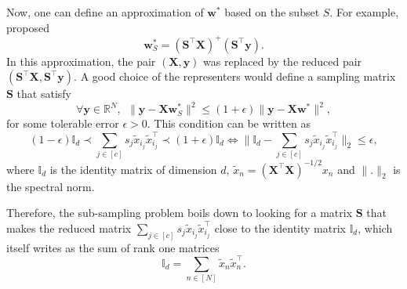\documentclass[twoside,11pt]{book}
\numberwithin{theorem}{chapter}
\numberwithin{definition}{chapter}
\numberwithin{proposition}{chapter}
\numberwithin{corollary}{chapter}
\numberwithin{example}{chapter}
\numberwithin{lemma}{chapter}
\numberwithin{assumption}{chapter}
\numberwithin{equation}{chapter}
\numberwithin{figure}{chapter}
\DeclareMathOperator{\Tran}{\intercal}
\begin{document}
 Now, one can define an approximation of $\bm{w}^{*}$ based on the subset $S$. For example, \cite*{DrMaMu06} proposed
\begin{equation}
\bm{w}_{S}^{*} = (\bm{S}^{\Tran}\bm{X})^{+} (\bm{S}^{\Tran}\bm{y}).
\end{equation}
In this approximation, the pair $(\bm{X},\bm{y})$ was replaced by the reduced pair $(\bm{S}^{\Tran}\bm{X},\bm{S}^{\Tran}\bm{y})$.
A good choice of the representers would define a sampling matrix $\bm{S}$ that satisfy
\begin{equation}
\forall \bm{y} \in \mathbb{R}^{N}, \:\: \|\bm{y} - \bm{X} \bm{w}_{S}^{*}\|^{2} \leq (1+\epsilon) \|\bm{y} - \bm{X} \bm{w}^{*}\|^{2},
\end{equation}
for some tolerable error $\epsilon >0$. This condition can be written as
\begin{equation}\label{eq:introduction_embedding_condition}
(1-\epsilon) \mathbb{I}_{d} \prec \sum\limits_{j \in [c]} s_{j} \tilde{x}_{i_{j}} \tilde{x}_{i_{j}}^{\Tran} \prec (1+\epsilon) \mathbb{I}_{d} \iff \big \|\mathbb{I}_{d} - \sum\limits_{j \in [c]} s_{j} \tilde{x}_{i_{j}} \tilde{x}_{i_{j}}^{\Tran} \big\|_{2} \leq \epsilon,
\end{equation}
where $\mathbb{I}_{d}$ is the identity matrix of dimension $d$, $\tilde{x}_{n} = (\bm{X}^{\Tran}\bm{X})^{-1/2} x_{n}$ and $\|.\|_{2}$ is the spectral norm.


Therefore, the sub-sampling problem boils down to looking for a matrix $\bm{S}$ that makes the reduced matrix $\sum_{j \in [c]} s_{j} \tilde{x}_{i_{j}} \tilde{x}_{i_{j}}^{\Tran}$ close to the identity matrix $\mathbb{I}_{d}$, which itself writes as the sum of rank one matrices
\begin{equation}\label{eq:sum_to_identity_real}
\mathbb{I}_{d} = \sum\limits_{n \in [N]}\tilde{x}_{n}\tilde{x}_{n}^{\Tran}.
\end{equation}
\end{document}

